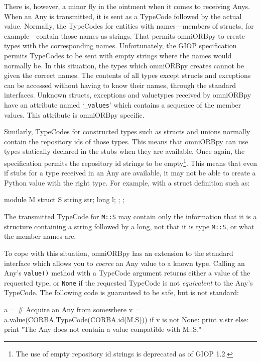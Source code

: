 \documentclass[11pt,twoside,a4paper]{book}
\newcommand{\type}[1]{\texttt{#1}}
\newcommand{\code}[1]{\texttt{#1}}
\newcommand{\op}[1]{\texttt{#1()}}
\newcommand{\term}[1]{\textit{#1}}
\begin{document}
There is, however, a minor fly in the ointment when it comes to
receiving Anys. When an Any is transmitted, it is sent as a TypeCode
followed by the actual value.  Normally, the TypeCodes for entities
with names---members of structs, for example---contain those names as
strings. That permits omniORBpy to create types with the corresponding
names. Unfortunately, the GIOP specification permits TypeCodes to be
sent with empty strings where the names would normally be. In this
situation, the types which omniORBpy creates cannot be given the
correct names. The contents of all types except structs and exceptions
can be accessed without having to know their names, through the
standard interfaces. Unknown structs, exceptions and valuetypes
received by omniORBpy have an attribute named `\code{\_values}' which
contains a sequence of the member values. This attribute is omniORBpy
specific.

Similarly, TypeCodes for constructed types such as structs and unions
normally contain the repository ids of those types. This means that
omniORBpy can use types statically declared in the stubs when they are
available. Once again, the specification permits the repository id
strings to be empty\footnote{The use of empty repository id strings is
deprecated as of GIOP 1.2.}. This means that even if stubs for a type
received in an Any are available, it may not be able to create a
Python value with the right type. For example, with a struct
definition such as:

\begin{idllisting}
module M {
  struct S {
    string str;
    long   l;
  };
};
\end{idllisting}

\noindent The transmitted TypeCode for \type{M::S} may contain only
the information that it is a structure containing a string followed by
a long, not that it is type \type{M::S}, or what the member names are.

To cope with this situation, omniORBpy has an extension to the
standard interface which allows you to \term{coerce} an Any value to a
known type. Calling an Any's \op{value} method with a TypeCode
argument returns either a value of the requested type, or \code{None}
if the requested TypeCode is not \term{equivalent} to the Any's
TypeCode. The following code is guaranteed to be safe, but is not
standard:

\begin{pylisting}
a = # Acquire an Any from somewhere
v = a.value(CORBA.TypeCode(CORBA.id(M.S)))
if v is not None:
    print v.str
else:
    print "The Any does not contain a value compatible with M::S."
\end{pylisting}
\end{document}
